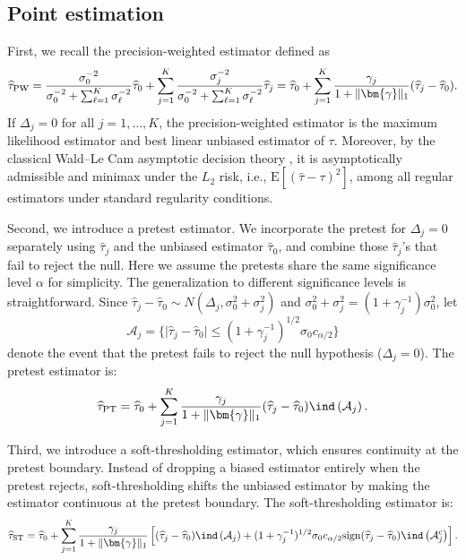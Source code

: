 \documentclass[11pt]{article}
\def\E{{\mathrm E}}
\newcommand{\htau}{\widehat\tau}
\numberwithin{equation}{section}
\theoremstyle{definition}
\begin{document}
\subsection{Point estimation}


First, we recall the precision-weighted estimator defined as
\[
  \htau_{\rm PW} = \frac{\sigma_0^{-2}}{\sigma_0^{-2} + \sum_{\ell=1}^K \sigma_\ell^{-2}} \htau_0 + \sum_{j=1}^K \frac{\sigma_j^{-2}}{\sigma_0^{-2} + \sum_{\ell=1}^K \sigma_\ell^{-2}} \htau_j = \htau_0 + \sum_{j=1}^K \frac{\gamma_j}{1+\lVert \bm{\gamma} \rVert_1} (\htau_j - \htau_0).
\]
If $\Delta_j=0$ for all $j=1,\ldots,K$, the precision-weighted estimator is the maximum likelihood estimator and best linear unbiased estimator of $\tau$. Moreover, by the classical Wald–Le Cam asymptotic decision theory \citep{wald1949statistical, le1956asymptotic}, it is asymptotically admissible and minimax under the $L_2$ risk, i.e., $\E[(\hat\tau - \tau)^2]$, among all regular estimators under standard regularity conditions.

Second, we introduce a pretest estimator. We incorporate the pretest for $\Delta_j = 0$ separately using $\htau_j$ and the unbiased estimator $\htau_0$, and combine those $\htau_j$'s that fail to reject the null. Here we assume the pretests share the same significance level $\alpha$ for simplicity. The generalization to different significance levels is straightforward. Since $\htau_j - \htau_0 \sim N(\Delta_j, \sigma_0^2 + \sigma_j^2)$ and $\sigma_0^2 + \sigma_j^2 = (1+\gamma_j^{-1}) \sigma_0^2$, let $$\mathcal{A}_j = \{\lvert \htau_j - \htau_0 \rvert \le (1+\gamma_j^{-1})^{1/2}\sigma_0 c_{\alpha/2}\}$$ denote the event that the pretest fails to reject the null hypothesis ($\Delta_j=0$). The pretest estimator is:
\begin{align*}
  \htau_{\rm PT} = \htau_0 + \sum_{j=1}^K \frac{\gamma_j}{1+\lVert \bm{\gamma} \rVert_1} (\htau_j - \htau_0) \ind\left(\mathcal{A}_j\right).
\end{align*}

Third, we introduce a soft-thresholding estimator, which ensures continuity at the pretest boundary. Instead of dropping a biased estimator entirely when the pretest rejects, soft-thresholding shifts the unbiased estimator by making the estimator continuous at the pretest boundary. The soft-thresholding estimator is:
\begin{align*}
  \htau_{\rm ST}= \htau_0 + \sum_{j=1}^K \frac{\gamma_j}{1+\lVert \bm{\gamma} \rVert_1} \left[(\htau_j - \htau_0) \ind\left(\mathcal{A}_j\right) + (1+\gamma_j^{-1})^{1/2}\sigma_0 c_{\alpha/2} {\rm sign}(\htau_j - \htau_0) \ind\left(\mathcal{A}_j^\textup{c}\right) \right].
\end{align*}
\end{document}
